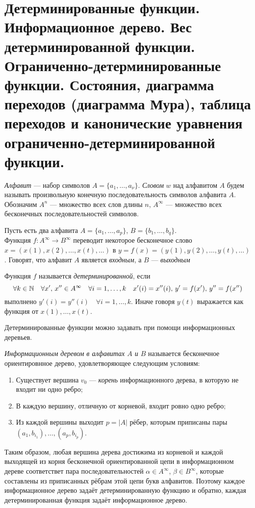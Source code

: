 \section{Детерминированные функции. Информационное дерево. Вес детерминированной функции. Ограниченно-детерминированные функции. Состояния, диаграмма переходов (диаграмма Мура), таблица переходов и канонические уравнения ограниченно-детерминированной функции.}

\begin{definition}
    \textit{Алфавит} --- набор символов $A = \{a_1, \ldots, a_\nu\}$. \textit{Словом} $w$ над алфавитом $A$ будем называть произвольную конечную последовательность символов алфавита $A$. Обозначим $A^n$ --- множество всех слов длины $n$, $A^{\infty}$ --- множество всех бесконечных последовательностей символов.
\end{definition}

\begin{definition}
    Пусть есть два алфавита $A=\{a_1, \ldots, a_p\}$, $B = \{b_1, \ldots, b_q\}$.\\
    Функция $f:A^{\infty} \to B^{\infty}$ переводит некоторое бесконечное слово $x = (x(1), x(2), \ldots, x(t), \ldots)$ в $y = f(x) = (y(1), y(2), \ldots, y(t), \ldots)$. Говорят, что алфавит $A$ является \textit{входным}, а $B$ --- \textit{выходным}
\end{definition}

\begin{definition}
    Функция $f$ называется \textit{детерминированной}, если 
    \[
        \forall k \in \mathbb{N} \quad \forall x',\,x'' \in A^{\infty} \quad \forall i = 1, \ldots, k \quad x'(i) = x''(i),\, y'=f(x'),\, y''=f(x'')
    \] выполнено $y'(i) = y''(i) \quad \forall i = 1,\ldots, k$. Иначе говоря $y(t)$ выражается как функция от $x(1), \ldots, x(t)$.
\end{definition}

Детерминированные функции можно задавать при помощи информационных деревьев.

\begin{definition}
    \textit{Информационным деревом в алфавитах $A$ и $B$} называется бесконечное ориентировнное дерево, удовлетворяющее следующим условиям:
    \begin{enumerate}[nolistsep]
        \item Существует вершина $v_0$ --- \textit{корень} информационного дерева, в которую не входит ни одно ребро;
        \item В каждую вершину, отличную от корневой, входит ровно одно ребро;
        \item Из каждой вершины выходит $p = |A|$ рёбер, которым приписаны пары $(a_1, b_{i_1}), \ldots, (a_p, b_{i_p})$.
    \end{enumerate}
    Таким образом, любая вершина дерева достижима из корневой и каждой выходящей из корня бесконечной ориентированной цепи в информационном дереве соответствет пара последовательностей $\alpha \in A^{\infty}$, $\beta \in B^{\infty}$, которые составлены из приписанных рёбрам этой цепи букв алфавитов. Поэтому каждое информационное дерево задаёт детерминированную функцию и обратно, каждая детерминированная функция задаёт информационное дерево.
\end{definition}

